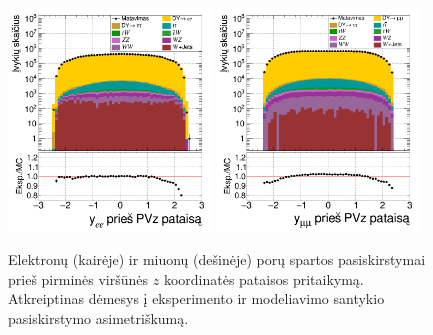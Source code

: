\documentclass[a4paper, 12pt, twoside]{article}
\begin{document}
\begin{figure}[H]
	\includegraphics[width=0.48\textwidth]{ee_rapi_beforePVZ.png}
	\includegraphics[width=0.48\textwidth]{mumu_rapi_beforePVZ.png}
	\caption{\label{fig:rapibPVZ} Elektronų (kairėje) ir miuonų (dešinėje) porų spartos pasiskirstymai
		prieš pirminės viršūnės $z$ koordinatės pataisos pritaikymą.
		Atkreiptinas dėmesys į eksperimento ir modeliavimo santykio pasiskirstymo asimetriškumą.}
\end{figure}
\end{document}
